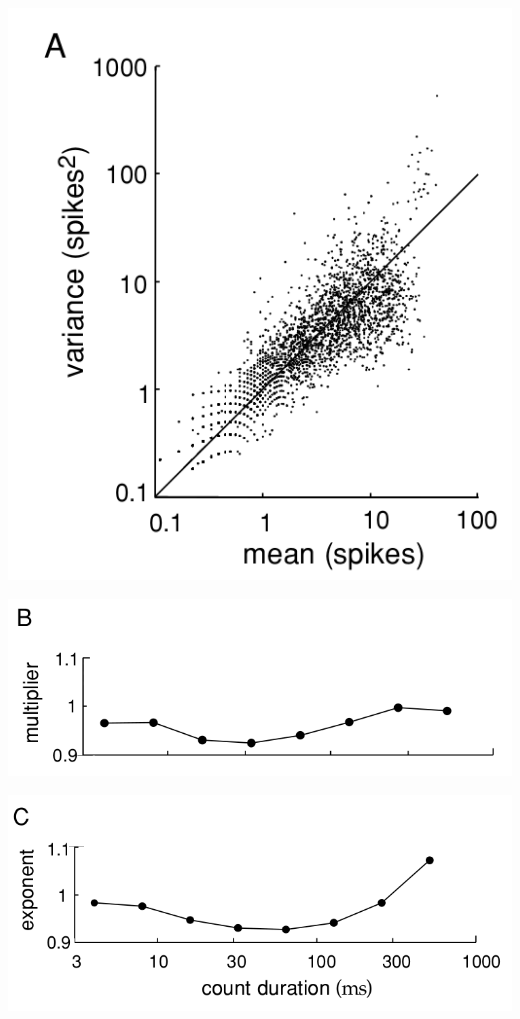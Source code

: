 \begin{center}
    \label{fig:1.14A}    
    \includegraphics[scale = 0.2]{png/Figure1-14-A.png}\\
\end{center}

\begin{center}
    \label{fig:1.14B}    
    \includegraphics[scale = 0.2]{png/Figure1-14-B.png}\\
\end{center}

\begin{center}
    \label{fig:1.14C}    
    \includegraphics[scale = 0.2]{png/Figure1-14-C.png}\\
\end{center}


